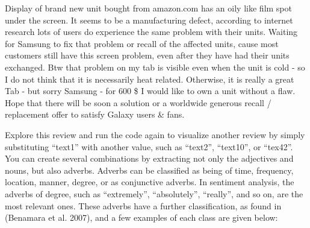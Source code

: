 \begin{Shaded}
\begin{Highlighting}[]
\OtherTok{\textless{}{-}} \NormalTok{)}
\NormalTok{  \}}

\NormalTok{\}}

\OtherTok{\textless{}{-}} 

\NormalTok{(}
\end{Highlighting}
\end{Shaded}

{\color{darkgreen} Display} of {\color{darkgreen} brand} {\color{red} new} {\color{darkgreen} unit} bought from {\color{blue} amazon.com} has an {\color{red} oily like} {\color{darkgreen} film spot} under the {\color{darkgreen} screen}. It seems to be a {\color{darkgreen} manufacturing defect}, according to {\color{darkgreen} internet research} {\color{darkgreen} lots} of {\color{darkgreen} users} do experience the {\color{red} same} {\color{darkgreen} problem} with their {\color{darkgreen} units}. Waiting for {\color{blue} Samsung} to fix that {\color{darkgreen} problem} or {\color{darkgreen} recall} of the {\color{red} affected} {\color{darkgreen} units}, cause {\color{red} most} {\color{darkgreen} customers} still have this {\color{darkgreen} screen problem}, even after they have had their {\color{darkgreen} units} exchanged. {\color{darkgreen} Btw} that {\color{darkgreen} problem} on my {\color{darkgreen} tab} is {\color{red} visible} even when the {\color{darkgreen} unit} is {\color{red} cold} - so I do not think that it is necessarily {\color{darkgreen} heat} related. Otherwise, it is really a {\color{red} great} {\color{blue} Tab} - but {\color{red} sorry} {\color{blue} Samsung} - for {\color{blue} 600 \$} I would like to own a {\color{darkgreen} unit} without a {\color{darkgreen} flaw}. {\color{darkgreen} Hope} that there will be soon a {\color{darkgreen} solution} or a {\color{red} worldwide generous} {\color{darkgreen} recall / replacement offer} to satisfy {\color{blue} Galaxy users \& fans}.

Explore this review and run the code again to visualize another review
by simply substituting ``text1'' with another value, such as ``text2'',
``text10'', or ``tex42''. You can create several combinations by
extracting not only the adjectives and nouns, but also adverbs. Adverbs can
be classified as being of time, frequency, location, manner, degree, or
as conjunctive adverbs. In sentiment analysis, the adverbs of degree, such
as ``extremely'', ``absolutely'', ``really'', and so on, are the most
relevant ones. These adverbs have a further classification, as found in
(Benamara et al. 2007), and a few examples of each class are given below:

